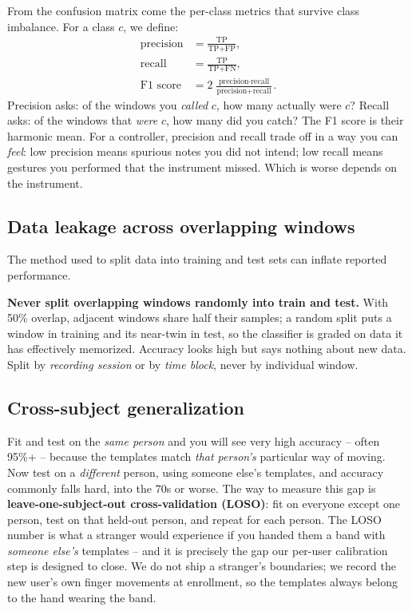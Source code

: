 From the confusion matrix come the per-class metrics that survive class imbalance. For a class $c$, we define:
\begin{align*}
  \text{precision} &= \frac{\text{TP}}{\text{TP}+\text{FP}}, \\
  \text{recall} &= \frac{\text{TP}}{\text{TP}+\text{FN}}, \\
  \text{F1 score} &= 2\,\frac{\text{precision}\cdot\text{recall}}{\text{precision}+\text{recall}}.
\end{align*}
Precision asks: of the windows you \emph{called} $c$, how many actually were $c$? Recall asks: of the windows that \emph{were} $c$, how many did you catch? The F1 score is their harmonic mean. For a controller, precision and recall trade off in a way you can \emph{feel}: low precision means spurious notes you did not intend; low recall means gestures you performed that the instrument missed. Which is worse depends on the instrument.

\subsection{Data leakage across overlapping windows}

The method used to split data into training and test sets can inflate reported performance.

\begin{trapbox}
\textbf{Never split overlapping windows randomly into train and test.} With 50\%
overlap, adjacent windows share half their samples; a random split puts a window
in training and its near-twin in test, so the classifier is graded on data it has
effectively memorized. Accuracy looks high but says nothing about new data. Split by
\emph{recording session} or by \emph{time block}, never by individual window.
\end{trapbox}

\subsection{Cross-subject generalization}

Fit and test on the \emph{same person}
and you will see very high accuracy -- often 95\%+ -- because the templates match
\emph{that person's} particular way of moving. Now test on a \emph{different}
person, using someone else's templates, and accuracy commonly falls hard, into the
70s or worse. The way to measure this gap is \textbf{leave-one-subject-out
cross-validation (LOSO)}: fit on everyone except one person, test on that held-out
person, and repeat for each person. The LOSO number is what a stranger would
experience if you handed them a band with \emph{someone else's} templates -- and it
is precisely the gap our per-user calibration step is designed to close. We do not
ship a stranger's boundaries; we record the new user's own finger movements at
enrollment, so the templates always belong to the hand wearing the band.

